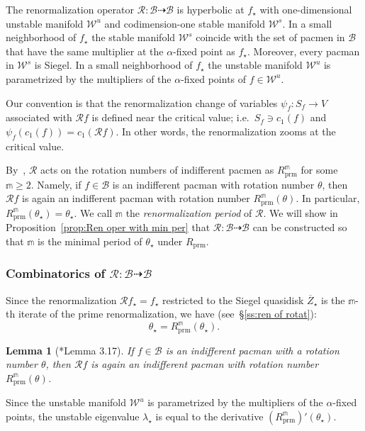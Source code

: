\documentclass{amsart}
\newcommand{\1}{{\mathbb 1 }}
\newcommand\RR{\mathcal{R}}
\newcommand\prm{{\operatorname{prm}}}
\newcommand\cRRc{R_{\prm}}%
\newcommand{\str}{{\star}}
\newcommand{\mm}{\mathbb{m}}
\newcommand\WW{\mathcal{W}}
\newcommand\BB{\mathcal{B}}
\newtheorem{lem}[thm]{Lemma}
\theoremstyle{remark}
\numberwithin{equation}{section}
\theoremstyle{definition}
\theoremstyle{nonumberbreak}
\begin{document}
The renormalization operator $\RR\colon \BB \dashrightarrow \BB$ is hyperbolic at $f_\str$ with one-dimensional unstable manifold $\WW^u$ and codimension-one stable manifold $\WW^s$. In a small neighborhood of $f_\str$ the stable manifold $\WW^s$ coincide with the set of pacmen in $\BB$ that have the same multiplier at the $\alpha$-fixed point as $f_\str$. Moreover, every pacman in $\WW^s$ is Siegel. In a small neighborhood of $f_\str$ the unstable manifold $\WW^u$ is parametrized by the multipliers of the $\alpha$-fixed points of $f\in \WW^u$. 

Our convention is that the renormalization change of variables $\psi_f\colon S_f\to V$ associated with $\RR f$ is defined near the critical value; i.e.~$S_f\ni c_1(f)$ and $\psi_f(c_1(f))=c_1(\RR f)$. In other words, the renormalization zooms at the critical value. 

By~\cite[Lemma 3.18]{DLS}, $\RR$ acts on the rotation numbers of indifferent pacmen as $\cRRc^\mm$ for some $\mm\ge 2$. Namely, if $f\in \BB$ is an indifferent pacman with rotation number $\theta$, then $\RR f$ is again an indifferent pacman with rotation number $\cRRc^\mm (\theta)$. In particular, $\cRRc^\mm(\theta_\str)=\theta_\str$. We call $\mm$ the \emph{renormalization period} of $\RR$. We will show in Proposition~\ref{prop:Ren oper with min per} that $\RR\colon \BB\dashrightarrow \BB$ can be constructed so that $\mm$ is the minimal period of $\theta_\str$ under $\cRRc$.



\subsubsection{Combinatorics of $\RR\colon \BB\dashrightarrow \BB$}
\label{sss:AntMatrix}
Since the renormalization $\RR f_\str=f_\str$ restricted to the Siegel quasidisk $\overline Z_\str$ is the $\mm$-th iterate of the prime renormalization, we have (see~\S\ref{ss:ren of rotat}):
\begin{equation}
\label{eq:theta is a per pnt}
\theta_\str=\cRRc^\mm(\theta_\str).
\end{equation}

\begin{lem}[\cite{DLS}*{Lemma 3.17}]
\label{lem:RR:rot numb act}
If $f\in \BB$ is an indifferent pacman with a rotation number $\theta$, then $\RR f$ is again an indifferent pacman with rotation number $\cRRc^\mm(\theta)$.
\end{lem}


 Since the unstable manifold $\WW^u$ is parametrized by the multipliers of the $\alpha$-fixed points, the unstable eigenvalue $\lambda_\str$ is equal to the derivative $(\cRRc^\mm)'(\theta_\str)$.
\end{document}
